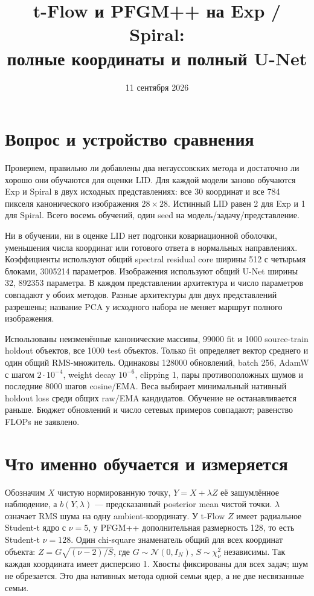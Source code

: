 \documentclass[10pt,a4paper]{article}
\title{t-Flow и PFGM++ на Exp / Spiral:\\полные координаты и полный U-Net}
\author{}
\date{11 сентября 2026}
\begin{document}
\maketitle
\vspace{-12mm}

\section*{Вопрос и устройство сравнения}
Проверяем, правильно ли добавлены два негауссовских метода и достаточно ли
хорошо они обучаются для оценки LID. Для каждой модели заново обучаются
Exp и Spiral в двух исходных представлениях: все 30 координат и все 784 пикселя
канонического изображения $28\times28$. Истинный LID равен 2 для Exp и 1 для
Spiral. Всего восемь обучений, один seed на модель/задачу/представление.

Ни в обучении, ни в оценке LID нет подгонки ковариационной оболочки, уменьшения
числа координат или готового ответа в нормальных направлениях. Коэффициенты
используют общий spectral residual core ширины 512 с четырьмя блоками,
3005214 параметров. Изображения используют общий U-Net ширины 32,
892353 параметра. В каждом представлении архитектура и число параметров
совпадают у обоих методов. Разные архитектуры для двух представлений разрешены;
название PCA у исходного набора не меняет маршрут полного изображения.

Использованы неизменённые канонические массивы, 99000 fit и 1000 source-train
holdout объектов, все 1000 test объектов. Только fit определяет вектор среднего
и один общий RMS-множитель. Одинаковы 128000 обновлений, batch 256, AdamW
с шагом $2\cdot10^{-4}$, weight decay $10^{-6}$, clipping 1, пары противоположных
шумов и последние 8000 шагов cosine/EMA. Веса выбирает минимальный нативный
holdout loss среди общих raw/EMA кандидатов. Обучение не останавливается раньше.
Бюджет обновлений и число сетевых примеров совпадают; равенство FLOPs не заявлено.

\section*{Что именно обучается и измеряется}
Обозначим $X$ чистую нормированную точку, $Y=X+\lambda Z$ её зашумлённое
наблюдение, а $b(Y,\lambda)$ --- предсказанный posterior mean чистой точки.
$\lambda$ означает RMS шума на одну ambient-координату. У t-Flow $Z$ имеет
радиальное Student-t ядро с $\nu=5$, у PFGM++ дополнительная размерность 128,
то есть Student-t $\nu=128$. Один chi-square знаменатель общий для всех
координат объекта: $Z=G\sqrt{(\nu-2)/S}$, где $G\sim\mathcal N(0,I_N)$,
$S\sim\chi^2_\nu$ независимы. Так каждая координата имеет дисперсию 1.
Хвосты фиксированы для всех задач; шум не обрезается.
Это два нативных метода одной семьи ядер, а не две несвязанные семьи.
\end{document}
